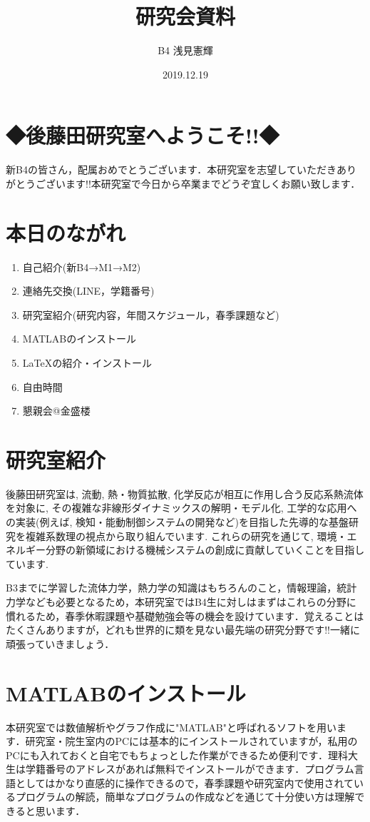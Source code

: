 \documentclass[autodetect-engine,dvipdfmx-if-dvi,ja=standard,a4paper,11pt]{bxjsarticle} %
\title{研究会資料} %
\author{B4 浅見憲輝} %
\date{2019.12.19}%
\begin{document}
%
%
\section*{◆後藤田研究室へようこそ!!◆}
%
新B4の皆さん，配属おめでとうございます．本研究室を志望していただきありがとうございます!!本研究室で今日から卒業までどうぞ宜しくお願い致します．

\section{本日のながれ}
\begin{enumerate}
  \item 自己紹介(新B4→M1→M2)
  \item 連絡先交換(LINE，学籍番号)
  \item 研究室紹介(研究内容，年間スケジュール，春季課題など)
  \item MATLABのインストール
  \item \LaTeX の紹介・インストール
  \item 自由時間
  \item 懇親会@金盛楼
\end{enumerate}
%
\section{研究室紹介}
後藤田研究室は, 流動, 熱・物質拡散, 化学反応が相互に作用し合う反応系熱流体を対象に, その複雑な非線形ダイナミックスの解明・モデル化, 工学的な応用への実装(例えば, 検知・能動制御システムの開発など)を目指した先導的な基盤研究を複雑系数理の視点から取り組んでいます. これらの研究を通じて, 環境・エネルギー分野の新領域における機械システムの創成に貢献していくことを目指しています\cite{GotoLab}.

B3までに学習した流体力学，熱力学の知識はもちろんのこと，情報理論，統計力学なども必要となるため，本研究室ではB4生に対しはまずはこれらの分野に慣れるため，春季休暇課題や基礎勉強会等の機会を設けています．覚えることはたくさんありますが，どれも世界的に類を見ない最先端の研究分野です!!一緒に頑張っていきましょう．

\section{MATLABのインストール}
本研究室では数値解析やグラフ作成に"MATLAB"と呼ばれるソフトを用います．研究室・院生室内のPCには基本的にインストールされていますが，私用のPCにも入れておくと自宅でもちょっとした作業ができるため便利です．理科大生は学籍番号のアドレスがあれば無料でインストールができます．プログラム言語としてはかなり直感的に操作できるので，春季課題や研究室内で使用されているプログラムの解読，簡単なプログラムの作成などを通じて十分使い方は理解できると思います．
\newpage
\end{document}
